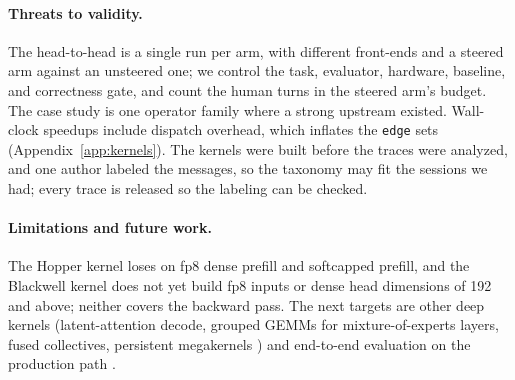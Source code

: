 \paragraph{Threats to validity.} The head-to-head is a single run per arm, with different
front-ends and a steered arm against an unsteered one; we control the task, evaluator, hardware,
baseline, and correctness gate, and count the human turns in the steered arm's budget. The case
study is one operator family where a strong upstream existed. Wall-clock speedups include dispatch
overhead, which inflates the \texttt{edge} sets (Appendix~\ref{app:kernels}). The kernels were built
before the traces were analyzed, and one author labeled the messages, so the taxonomy may fit the
sessions we had; every trace is released so the labeling can be checked.

\paragraph{Limitations and future work.} The Hopper kernel loses on fp8 dense prefill and
softcapped prefill, and the Blackwell kernel does not yet build fp8 inputs or dense head dimensions
of 192 and above; neither covers the backward pass. The next targets are other deep kernels (latent-attention decode, grouped GEMMs for
mixture-of-experts layers, fused collectives, persistent megakernels \cite{jin2026eventtensor}) and
end-to-end evaluation on the production path \cite{oliaro2026fastkernels}.
